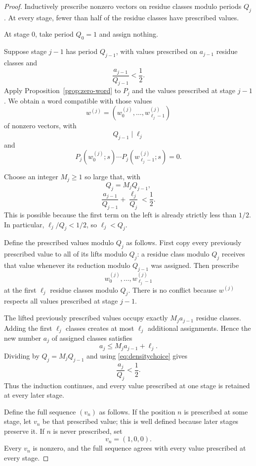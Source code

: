 \documentclass[11pt]{article}
\begin{document}
\begin{proof}
Inductively prescribe nonzero vectors on residue classes modulo periods $Q_j$.  At every stage, fewer than half of the residue classes have prescribed values.

At stage $0$, take period $Q_0=1$ and assign nothing.

Suppose stage $j-1$ has period $Q_{j-1}$, with values prescribed on $a_{j-1}$ residue classes and
\[
\frac{a_{j-1}}{Q_{j-1}}<\frac12.
\]
Apply Proposition~\ref{prop:zero-word} to $P_j$ and the values prescribed at stage $j-1$.  We obtain a word compatible with those values
\[
w^{(j)}=(w^{(j)}_0,\ldots,w^{(j)}_{\ell_j-1})
\]
of nonzero vectors, with
\[
Q_{j-1}\mid\ell_j
\]
and
\begin{equation}\label{eq:wordzeroj}
P_j(w^{(j)}_0;s)\cdots P_j(w^{(j)}_{\ell_j-1};s)=0.
\end{equation}

Choose an integer $M_j\ge1$ so large that, with
\[
Q_j=M_jQ_{j-1},
\]
\begin{equation}\label{eq:densitychoice}
\frac{a_{j-1}}{Q_{j-1}}+\frac{\ell_j}{Q_j}<\frac12.
\end{equation}
This is possible because the first term on the left is already strictly less than $1/2$.  In particular, $\ell_j/Q_j<1/2$, so $\ell_j<Q_j$.

Define the prescribed values modulo $Q_j$ as follows.  First copy every previously prescribed value to all of its lifts modulo $Q_j$: a residue class modulo $Q_j$ receives that value whenever its reduction modulo $Q_{j-1}$ was assigned.  Then prescribe
\[
w^{(j)}_0,\ldots,w^{(j)}_{\ell_j-1}
\]
at the first $\ell_j$ residue classes modulo $Q_j$.  There is no conflict because $w^{(j)}$ respects all values prescribed at stage $j-1$.

The lifted previously prescribed values occupy exactly $M_ja_{j-1}$ residue classes.  Adding the first $\ell_j$ classes creates at most $\ell_j$ additional assignments.  Hence the new number $a_j$ of assigned classes satisfies
\[
a_j\le M_ja_{j-1}+\ell_j.
\]
Dividing by $Q_j=M_jQ_{j-1}$ and using \eqref{eq:densitychoice} gives
\[
\frac{a_j}{Q_j}<\frac12.
\]
Thus the induction continues, and every value prescribed at one stage is retained at every later stage.

Define the full sequence $(v_n)$ as follows.  If the position $n$ is prescribed at some stage, let $v_n$ be that prescribed value; this is well defined because later stages preserve it.  If $n$ is never prescribed, set
\[
v_n=(1,0,0).
\]
Every $v_n$ is nonzero, and the full sequence agrees with every value prescribed at every stage.


\end{proof}
\end{document}
